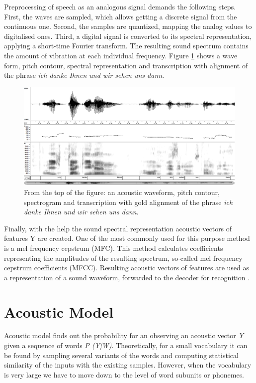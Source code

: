 Preprocessing of speech as an analogous signal demands the following steps. First, the waves are sampled, which allows getting a discrete signal from the 
continuous one. Second, the samples are quantized, mapping the analog values to digitalised ones. Third, a digital signal is converted to its 
spectral representation, applying a short-time Fourier transform. The resulting sound spectrum contains the amount of vibration at each individual frequency. 
Figure \ref {fig:spectro} shows a wave form, pitch contour, spectral
representation and transcription with alignment of the phrase \textit {ich danke
 Ihnen und wir sehen uns dann}.
\begin{figure}[htbp]
  \centering
    \includegraphics[width=1.0\textwidth]{images/spectro.png}
 \caption{From the top of the figure: an acoustic waveform, pitch contour,
 spectrogram and transcription with gold alignment of the phrase \textit {ich
 danke Ihnen und wir sehen uns dann}. }
  \label{fig:spectro}
\end {figure}

Finally, with the help the sound spectral representation acoustic vectors of
features Y are created. One of the most commonly used for this purpose method is a mel frequency
cepstrum (MFC). This method calculates coefficients representing the amplitudes
of the resulting spectrum, so-called mel frequency cepstrum coefficients (MFCC).
Resulting acoustic vectors of features are used as a representation of a sound waveform, forwarded to the decoder for recognition  \parencite
{jurafskymartin2009}.

\section {Acoustic Model} 

Acoustic model finds out the probability for an observing an acoustic vector
\textit {Y } given a sequence of words \textit {P (Y|W)}. Theoretically, for a
small vocabulary it can be found by sampling several variants of the words and computing statistical similarity of the inputs with 
the existing samples. However, when the vocabulary is very large we have to move
down to the level of word subunits or phonemes.

